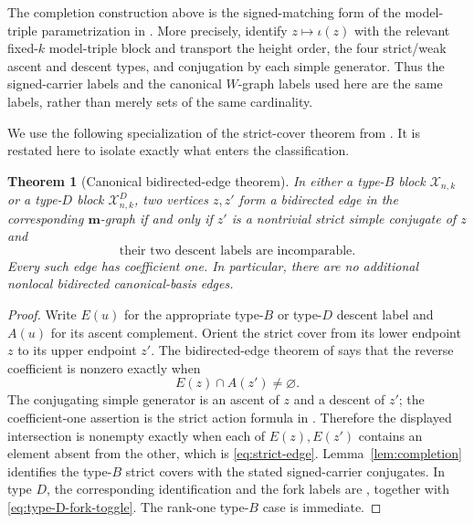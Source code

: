 \documentclass[11pt]{article}
\newtheorem{theorem}{Theorem}[section]
\theoremstyle{definition}
\theoremstyle{remark}
\newcommand{\cX}{\mathcal X}
\newcommand{\mgraph}{\mathbf m}
\begin{document}
The completion construction above is the signed-matching form of the
model-triple parametrization in \cite{MZGelfand}.  More precisely,
\cite[Lemmas~3.27--3.28 and Theorem~1.10]{MZGelfand} identify
$z\mapsto\iota(z)$ with the relevant fixed-$k$ model-triple block and
transport the height order, the four strict/weak ascent and descent
types, and conjugation by each simple generator.  Thus the signed-carrier
labels and the canonical $W$-graph labels used here are the same labels,
rather than merely sets of the same cardinality.

We use the following specialization of the strict-cover theorem from
\cite[Corollary~3.14]{MZGelfand}.  It is restated here to isolate exactly
what enters the classification.

\begin{theorem}[Canonical bidirected-edge theorem]
\label{thm:all-edges}
In either a type-$B$ block $\cX_{n,k}$ or a type-$D$ block
$\cX^D_{n,k}$, two vertices $z,z'$ form a bidirected edge in the
corresponding $\mgraph$-graph if and only if $z'$ is a nontrivial strict
simple conjugate of $z$ and
\begin{equation}
 \text{their two descent labels are incomparable}.
\label{eq:strict-edge}
\end{equation}
Every such edge has coefficient one.  In particular, there are no
additional nonlocal bidirected canonical-basis edges.
\end{theorem}

\begin{proof}
Write $E(u)$ for the appropriate type-$B$ or type-$D$ descent label and
$A(u)$ for its ascent complement.  
Orient the strict cover from its lower endpoint $z$ to its upper endpoint
$z'$.  The
bidirected-edge theorem of \cite[Corollary~3.14]{MZGelfand} says that the
reverse coefficient is nonzero exactly when
\[
                         E(z)\cap A(z')\ne\varnothing.
\]
The conjugating simple generator is an ascent of $z$ and a descent of
$z'$; the coefficient-one
assertion is the strict
action formula in \cite[Lemma~3.11 and Theorem~3.13]{MZGelfand}.
Therefore the displayed intersection is
nonempty exactly when each of $E(z),E(z')$ contains an element absent
from the other, which is \eqref{eq:strict-edge}.  Lemma~\ref{lem:completion}
identifies the type-$B$ strict covers with the stated signed-carrier
conjugates.  In type $D$, the corresponding identification and the fork
labels are \cite[Lemmas~3.27--3.28 and Proposition~2.5]{MZGelfand},
together with \eqref{eq:type-D-fork-toggle}.
The rank-one type-$B$ case is immediate.
\end{proof}
\end{document}
